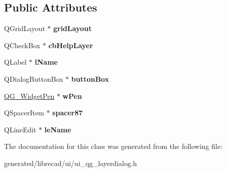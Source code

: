 \subsection*{Public Attributes}
\begin{DoxyCompactItemize}
\item 
\hypertarget{classUi__QG__LayerDialog_a38c3604d7f10856e7401f53f164433ce}{Q\-Grid\-Layout $\ast$ {\bfseries grid\-Layout}}\label{classUi__QG__LayerDialog_a38c3604d7f10856e7401f53f164433ce}

\item 
\hypertarget{classUi__QG__LayerDialog_a00301346187da2b024b3dea729cdf0ac}{Q\-Check\-Box $\ast$ {\bfseries cb\-Help\-Layer}}\label{classUi__QG__LayerDialog_a00301346187da2b024b3dea729cdf0ac}

\item 
\hypertarget{classUi__QG__LayerDialog_a68d81f3ec1ecc28540edb1ad5812f143}{Q\-Label $\ast$ {\bfseries l\-Name}}\label{classUi__QG__LayerDialog_a68d81f3ec1ecc28540edb1ad5812f143}

\item 
\hypertarget{classUi__QG__LayerDialog_a88441fb4f56023b4715b2439fee96680}{Q\-Dialog\-Button\-Box $\ast$ {\bfseries button\-Box}}\label{classUi__QG__LayerDialog_a88441fb4f56023b4715b2439fee96680}

\item 
\hypertarget{classUi__QG__LayerDialog_a1b5ee330c67dca5c655b1d41d686fc14}{\hyperlink{classQG__WidgetPen}{Q\-G\-\_\-\-Widget\-Pen} $\ast$ {\bfseries w\-Pen}}\label{classUi__QG__LayerDialog_a1b5ee330c67dca5c655b1d41d686fc14}

\item 
\hypertarget{classUi__QG__LayerDialog_aa09b634bf94798b5ec3ac7ea24ffff4c}{Q\-Spacer\-Item $\ast$ {\bfseries spacer87}}\label{classUi__QG__LayerDialog_aa09b634bf94798b5ec3ac7ea24ffff4c}

\item 
\hypertarget{classUi__QG__LayerDialog_a5bbcfa9afc45e5f88edd1d1f4337ef73}{Q\-Line\-Edit $\ast$ {\bfseries le\-Name}}\label{classUi__QG__LayerDialog_a5bbcfa9afc45e5f88edd1d1f4337ef73}

\end{DoxyCompactItemize}


The documentation for this class was generated from the following file\-:\begin{DoxyCompactItemize}
\item 
generated/librecad/ui/ui\-\_\-qg\-\_\-layerdialog.\-h\end{DoxyCompactItemize}
